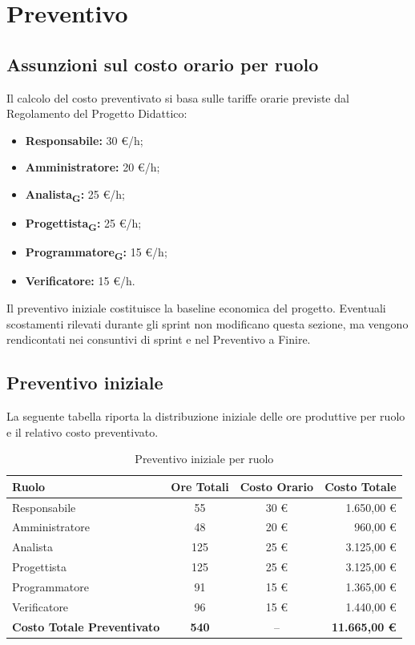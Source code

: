 \section{Preventivo}

\subsection{Assunzioni sul costo orario per ruolo}

Il calcolo del costo preventivato si basa sulle tariffe orarie previste dal
Regolamento del Progetto Didattico:
\begin{itemize}
	\item \textbf{Responsabile:} 30 \euro/h;
	\item \textbf{Amministratore:} 20 \euro/h;
	\item \textbf{Analista\textsubscript{G}:} 25 \euro/h;
	\item \textbf{Progettista\textsubscript{G}:} 25 \euro/h;
	\item \textbf{Programmatore\textsubscript{G}:} 15 \euro/h;
	\item \textbf{Verificatore:} 15 \euro/h.
\end{itemize}

Il preventivo iniziale costituisce la baseline economica del progetto. Eventuali
scostamenti rilevati durante gli sprint non modificano questa sezione, ma vengono
rendicontati nei consuntivi di sprint e nel Preventivo a Finire.

\subsection{Preventivo iniziale}

La seguente tabella riporta la distribuzione iniziale delle ore produttive per
ruolo e il relativo costo preventivato.

\begin{table}[H]
	\centering
	\renewcommand{\arraystretch}{1.3}
	\begin{tabular}{|l|c|c|r|}
		\hline
		\textbf{Ruolo} & \textbf{Ore Totali} & \textbf{Costo Orario} & \textbf{Costo Totale} \\
		\hline
		Responsabile & 55 & 30 \euro & 1.650,00 \euro \\
		Amministratore & 48 & 20 \euro & 960,00 \euro \\
		Analista & 125 & 25 \euro & 3.125,00 \euro \\
		Progettista & 125 & 25 \euro & 3.125,00 \euro \\
		Programmatore & 91 & 15 \euro & 1.365,00 \euro \\
		Verificatore & 96 & 15 \euro & 1.440,00 \euro \\
		\hline
		\textbf{Costo Totale Preventivato} & \textbf{540} & -- & \textbf{11.665,00 \euro} \\
		\hline
	\end{tabular}
	\caption{Preventivo iniziale per ruolo}
\end{table}

